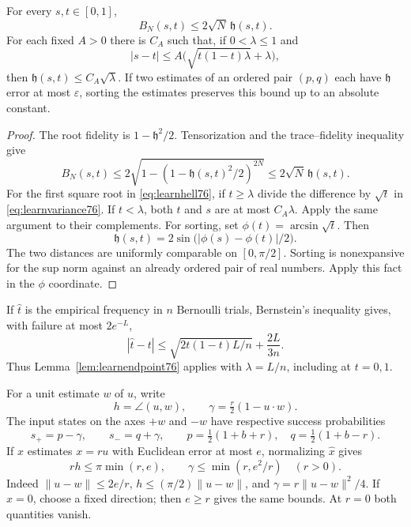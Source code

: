 \begin{lemma}
\label{lem:learnendpoint76}
For every $s,t\in[0,1]$,
\begin{equation}\label{eq:learnproduct76}
 B_N(s,t)\le2\sqrt N\,\mathfrak h(s,t).
\end{equation}
For each fixed $A>0$ there is $C_A$ such that, if $0<\lambda\le1$ and
\begin{equation}\label{eq:learnvariance76}
 |s-t|\le A\bigl(\sqrt{t(1-t)\lambda}+\lambda\bigr),
\end{equation}
then $\mathfrak h(s,t)\le C_A\sqrt\lambda$.
If two estimates of an ordered pair $(p,q)$ each have
$\mathfrak h$ error at most $\varepsilon$, sorting the estimates
preserves this bound up to an absolute constant.
\end{lemma}
\begin{proof}
The root fidelity is $1-\mathfrak h^2/2$.  Tensorization and the
trace--fidelity inequality give
\[
 B_N(s,t)\le
 2\sqrt{1-(1-\mathfrak h(s,t)^2/2)^{2N}}
 \le2\sqrt N\,\mathfrak h(s,t).
\]
For the first square root in \eqref{eq:learnhell76}, if $t\ge\lambda$
divide the difference by $\sqrt t$ in
\eqref{eq:learnvariance76}.  If $t<\lambda$, both $t$ and $s$ are
at most $C_A\lambda$.  Apply the same argument to their complements.
For sorting, set $\phi(t)=\arcsin\sqrt t$.  Then
\[
 \mathfrak h(s,t)=2\sin\bigl(|\phi(s)-\phi(t)|/2\bigr).
\]
The two distances are uniformly comparable on $[0,\pi/2]$.
Sorting is nonexpansive for the sup norm against an already ordered
pair of real numbers.  Apply this fact in the $\phi$ coordinate.
\end{proof}

If $\widehat t$ is the empirical frequency in $n$ Bernoulli trials,
Bernstein's inequality gives, with failure at most $2e^{-L}$,
\begin{equation}\label{eq:learnbernstein76}
 |\widehat t-t|
 \le\sqrt{2t(1-t)L/n}+\frac{2L}{3n}.
\end{equation}
Thus Lemma~\ref{lem:learnendpoint76} applies with
$\lambda=L/n$, including at $t=0,1$.

For a unit estimate $w$ of $u$, write
\begin{equation}\label{eq:learnmisalignment76}
 h=\angle(u,w),\qquad
 \gamma=\tfrac r2(1-u\cdot w).
\end{equation}
The input states on the axes $+w$ and $-w$ have respective success
probabilities
\begin{equation}\label{eq:learnaxisprob76}
 s_+=p-\gamma,\qquad s_-=q+\gamma,
 \qquad p=\tfrac12(1+b+r),\quad q=\tfrac12(1+b-r).
\end{equation}
If $\widehat x$ estimates $x=ru$ with Euclidean error at most $e$,
normalizing $\widehat x$ gives
\begin{equation}\label{eq:learnaxiserror76}
 rh\le\pi\min(r,e),\qquad
 \gamma\le\min(r,e^2/r)\quad(r>0).
\end{equation}
Indeed $\|u-w\|\le2e/r$, $h\le(\pi/2)\|u-w\|$, and
$\gamma=r\|u-w\|^2/4$.  If $\widehat x=0$, choose a fixed direction;
then $e\ge r$ gives the same bounds.  At $r=0$ both quantities vanish.

